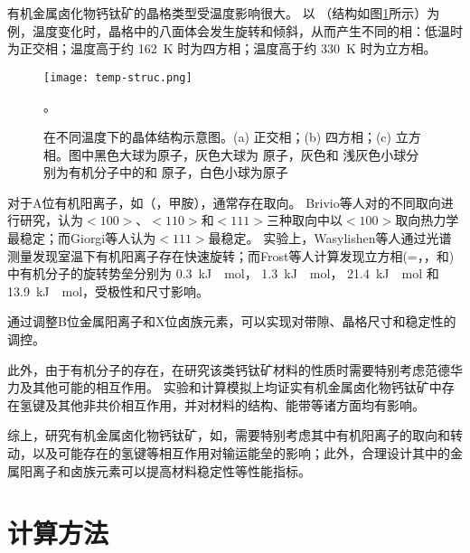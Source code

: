 有机金属卤化物钙钛矿的晶格类型受温度影响很大。
以 （结构如图\ref{fig:temp-struc}所示）为例，温度变化时，晶格中的八面体会发生旋转和倾斜，从而产生不同的相：低温时为正交相；温度高于约 \SI{162}{K} 时为四方相；温度高于约 \SI{330}{K} 时为立方相。

\begin{figure}[htbp]
    \centering
    \texttt{[image: temp-struc.png]}
    \caption{在不同温度下的晶体结构示意图。(a) 正交相；(b) 四方相；(c) 立方相。图中黑色大球为原子，灰色大球为  原子，灰色和 浅灰色小球分别为有机分子中的和 原子，白色小球为原子}。
    \label{fig:temp-struc}
\end{figure}

对于A位有机阳离子，如（，甲胺），通常存在取向。
Brivio等人对的不同取向进行研究，认为$<100>$、$<110>$和$<111>$三种取向中以$<100>$取向热力学最稳定；而Giorgi等人认为$<111>$最稳定。
实验上，Wasylishen等人通过光谱测量发现室温下有机阳离子存在快速旋转；而Frost等人计算发现立方相(=，，和)中有机分子的旋转势垒分别为 \SI{0.3}{kJ \per \mole}， \SI{1.3}{kJ \per \mole}，  \SI{21.4}{kJ \per\mole} 和 \SI{13.9}{kJ \per \mole}，受极性和尺寸影响。

通过调整B位金属阳离子和X位卤族元素，可以实现对带隙、晶格尺寸和稳定性的调控。

此外，由于有机分子的存在，在研究该类钙钛矿材料的性质时需要特别考虑范德华力及其他可能的相互作用。
实验和计算模拟上均证实有机金属卤化物钙钛矿中存在氢键及其他非共价相互作用，并对材料的结构、能带等诸方面均有影响。

综上，研究有机金属卤化物钙钛矿，如，需要特别考虑其中有机阳离子的取向和转动，以及可能存在的氢键等相互作用对输运能垒的影响；此外，合理设计其中的金属阳离子和卤族元素可以提高材料稳定性等性能指标。

\section{计算方法}

